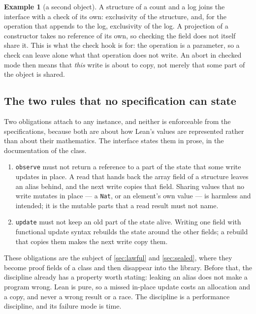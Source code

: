 \documentclass[11pt,a4paper]{article}
\theoremstyle{definition}
\newtheorem{example}[definition]{Example}
\theoremstyle{plain}
\newcommand{\code}[1]{\texttt{#1}}
\begin{document}
\begin{example}[a second object]\label{ex:counter}
A structure of a count and a log joins the interface with a check of its own:
exclusivity of the structure, and, for the operation that appends to the log,
exclusivity of the log. A projection of a constructor takes no reference of its
own, so checking the field does not itself share it. This is what the check hook
is for: the operation is a parameter, so a check can leave alone what that
operation does not write. An abort in checked mode then means that \emph{this}
write is about to copy, not merely that some part of the object is shared.
\end{example}

\subsection{The two rules that no specification can state}

Two obligations attach to any instance, and neither is enforceable from the
specifications, because both are about how Lean's values are represented rather
than about their mathematics. The interface states them in prose, in the
documentation of the class.

\begin{enumerate}[leftmargin=1.4em,itemsep=2pt]
\item \code{observe} must not return a reference to a part of the state that some
write updates in place. A read that hands back the array field of a structure
leaves an alias behind, and the next write copies that field. Sharing values
that no write mutates in place --- a \code{Nat}, or an element's own value --- is
harmless and intended; it is the mutable parts that a read result must not name.
\item \code{update} must not keep an old part of the state alive. Writing one
field with functional update syntax rebuilds the state around the other fields;
a rebuild that copies them makes the next write copy them.
\end{enumerate}

These obligations are the subject of \cref{sec:lawful} and \cref{sec:sealed},
where they become proof fields of a class and then disappear into the library.
Before that, the discipline already has a property worth stating: leaking an
alias does not make a program wrong. Lean is pure, so a missed in-place update
costs an allocation and a copy, and never a wrong result or a race. The
discipline is a performance discipline, and its failure mode is time.
\end{document}
